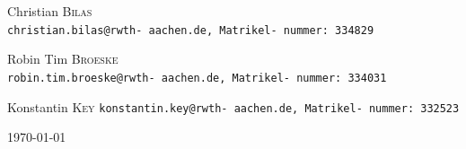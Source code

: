 \begin{titlepage}
\begin{center}
\begin{minipage}{0.3\textwidth}
\begin{flushleft} \large
Christian \textsc{Bilas}\\
\texttt{christian.bilas@rwth- aachen.de, Matrikel- nummer: 334829}
\end{flushleft}
\end{minipage}
\hfill
\begin{minipage}{0.35\textwidth}
\begin{center} \large
Robin Tim \textsc{Broeske}\\
\texttt{robin.tim.broeske@rwth- aachen.de, Matrikel- nummer: 334031}
\end{center}
\end{minipage}
\hfill
\begin{minipage}{0.3\textwidth}
\begin{flushright} \large
Konstantin \textsc{Key}
\texttt{konstantin.key@rwth- aachen.de, Matrikel- nummer: 332523}
\end{flushright}
\end{minipage}

\vfill

{\large \today}

\end{center}

\end{titlepage}